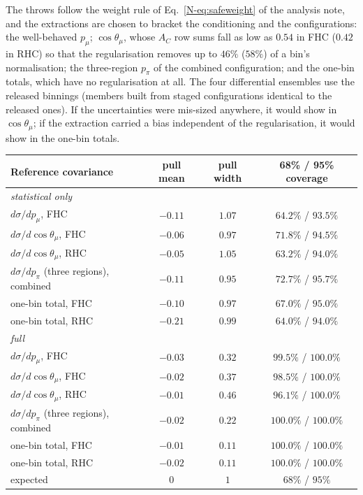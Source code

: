 \documentclass[11pt,a4paper]{article}
\newcommand{\noteref}[2]{#1~\ref{N-#2} of the analysis note}
\begin{document}
The throws follow the weight rule of \noteref{Eq.}{eq:safeweight}, and the extractions are
chosen to bracket the conditioning and the configurations: the well-behaved $p_\mu$;
$\cos\theta_\mu$, whose $A_C$ row sums fall as low as $0.54$ in FHC ($0.42$ in RHC) so that the
regularisation removes up to $46\%$ ($58\%$) of a bin's normalisation; the three-region $p_\pi$ of
the combined configuration; and the one-bin totals, which have no regularisation at all. The four
differential ensembles use the released binnings (members built from staged configurations
identical to the released ones). If the uncertainties were mis-sized anywhere, it would show in
$\cos\theta_\mu$; if the extraction carried a bias independent of the regularisation, it would
show in the one-bin totals.

\begin{center}
\small
\begin{tabular}{lccc}
\toprule
Reference covariance & pull mean & pull width & 68\% / 95\% coverage \\
\midrule
\multicolumn{4}{l}{\emph{statistical only}}\\
$d\sigma/dp_\mu$, FHC                    & $-0.11$ & $1.07$ & $64.2\%$ / $93.5\%$ \\
$d\sigma/d\cos\theta_\mu$, FHC           & $-0.06$ & $0.97$ & $71.8\%$ / $94.5\%$ \\
$d\sigma/d\cos\theta_\mu$, RHC           & $-0.05$ & $1.05$ & $63.2\%$ / $94.0\%$ \\
$d\sigma/dp_\pi$ (three regions), combined & $-0.11$ & $0.95$ & $72.7\%$ / $95.7\%$ \\
one-bin total, FHC                       & $-0.10$ & $0.97$ & $67.0\%$ / $95.0\%$ \\
one-bin total, RHC                       & $-0.21$ & $0.99$ & $64.0\%$ / $94.0\%$ \\
\midrule
\multicolumn{4}{l}{\emph{full}}\\
$d\sigma/dp_\mu$, FHC                    & $-0.03$ & $0.32$ & $99.5\%$ / $100.0\%$ \\
$d\sigma/d\cos\theta_\mu$, FHC           & $-0.02$ & $0.37$ & $98.5\%$ / $100.0\%$ \\
$d\sigma/d\cos\theta_\mu$, RHC           & $-0.01$ & $0.46$ & $96.1\%$ / $100.0\%$ \\
$d\sigma/dp_\pi$ (three regions), combined & $-0.02$ & $0.22$ & $100.0\%$ / $100.0\%$ \\
one-bin total, FHC                       & $-0.01$ & $0.11$ & $100.0\%$ / $100.0\%$ \\
one-bin total, RHC                       & $-0.02$ & $0.11$ & $100.0\%$ / $100.0\%$ \\
\midrule
expected                & $0$     & $1$    & $68\%$ / $95\%$ \\
\bottomrule
\end{tabular}
\end{center}
\end{document}
